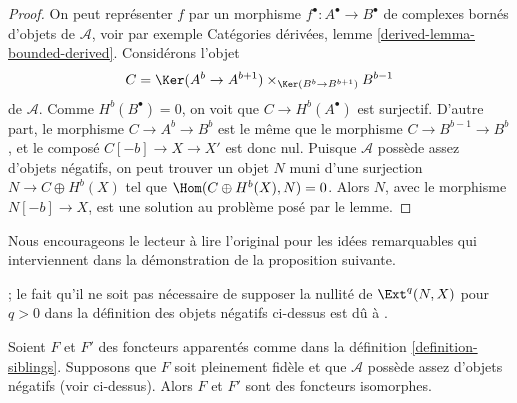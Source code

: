 \begin{proof}
On peut représenter $f$ par un morphisme $f^\bullet : A^\bullet \to B^\bullet$
de complexes bornés d'objets de $\mathcal{A}$, voir par exemple
Catégories dérivées, lemme \ref{derived-lemma-bounded-derived}.
Considérons l'objet
$$
C = \Ker(A^b \to A^{b + 1}) \times_{\Ker(B^b \to B^{b + 1})} B^{b - 1}
$$
de $\mathcal{A}$. Comme $H^b(B^\bullet) = 0$, on voit que
$C \to H^b(A^\bullet)$ est surjectif. D'autre part, le morphisme
$C \to A^b \to B^b$ est le même que le morphisme $C \to B^{b - 1} \to B^b$,
et le composé $C[-b] \to X \to X'$ est donc nul.
Puisque $\mathcal{A}$ possède assez d'objets négatifs, on peut trouver un objet $N$
muni d'une surjection $N \to C \oplus H^b(X)$ tel que
$\Hom(C \oplus H^b(X), N) = 0$. Alors $N$, avec le morphisme
$N[-b] \to X$, est une solution au problème posé par le lemme.
\end{proof}

\noindent
Nous encourageons le lecteur à lire l'original
\cite[Proposition 2.16]{Orlov-K3} pour les idées remarquables
qui interviennent dans la démonstration de la proposition suivante.

\begin{proposition}
\label{proposition-siblings-isomorphic}
\begin{reference}
\cite[Proposition 2.16]{Orlov-K3} ; le fait qu'il ne soit pas nécessaire
de supposer la nullité de $\Ext^q(N, X)$ pour $q > 0$ dans la définition
des objets négatifs ci-dessus est dû à \cite{Canonaco-Stellari}.
\end{reference}
Soient $F$ et $F'$ des foncteurs apparentés comme dans la définition \ref{definition-siblings}.
Supposons que $F$ soit pleinement fidèle et que $\mathcal{A}$ possède assez
d'objets négatifs (voir ci-dessus). Alors $F$ et $F'$ sont des foncteurs isomorphes.
\end{proposition}

